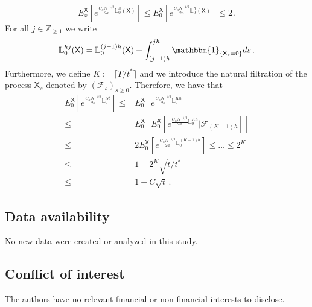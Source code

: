 \documentclass[a4paper,11pt,oneside,reqno]{amsart}
\theoremstyle{definition}
\renewcommand{\leq}{\leqslant}
\renewcommand{\geq}{\geqslant}
\numberwithin{equation}{section}
\begin{document}
{\begin{equation*}
	E_{x}^{\mathsf{X}}\left[e^{\frac{C_{\alpha}N^{-1/2}}{2a} \mathbb{L}^{h}_{0}(\mathsf{X})}\right]\leq E_{0}^{\mathsf{X}}\left[e^{\frac{C_{\alpha}N^{-1/2}}{2a} \mathbb{L}^{h}_{0}(\mathsf{X})}\right]\leq 2\,.
\end{equation*}
For all $j\in \mathbb{Z}_{\geq 1}$ we write
\begin{equation*}
	\mathbb{L}_{0}^{hj}(\mathsf{X})=\mathbb{L}_{0}^{(j-1)h}(\mathsf{X})+\int_{(j-1)h}^{jh}\mathbbm{1}_{\{\mathsf{X}_{s}=0\}}ds\,.
\end{equation*}
Furthermore, we define $K:=\lceil T/t^{*} \rceil$ and we introduce the natural filtration of the process $\mathsf{X}_{s}$ denoted by $\left(\mathcal{F}_{s}\right)_{s\geq 0}$. Therefore, we have that 
\begin{equation*}
	\begin{split}
		E_{0}^{\mathsf{X}}\left[e^{\frac{C_{\alpha}N^{-1/2}}{2a}\mathbb{L}_{0}^{Nt}}\right]\leq &	E_{0}^{\mathsf{X}}\left[e^{\frac{C_{\alpha}N^{-1/2}}{2a}\mathbb{L}_{0}^{Kh}}\right]
		\\\leq& 	E_{0}^{\mathsf{X}}\left[E_{0}^{\mathsf{X}}\left[e^{\frac{C_{\alpha}N^{-1/2}}{2a}\mathbb{L}_{0}^{Kh}}\bigg|\mathcal{F}_{(K-1)h}\right]\right]
		\\\leq&
		2E_{0}^{\mathsf{X}}\left[e^{\frac{C_{\alpha}N^{-1/2}}{2a}\mathbb{L}_{0}^{(K-1)h}}\right]\leq \ldots \leq 2^{K}
		\\\leq & 
		1+2^{K}\sqrt{t/t^{*}}
		\\\leq &
		1+ C\sqrt{t}\,.
	\end{split}
\end{equation*}
}

\subsection*{Data availability}
No new data were created or analyzed in this study.
\subsection*{Conflict of interest}
The authors have no relevant financial or non-financial interests to disclose. 

\printbibliography
\end{document}
